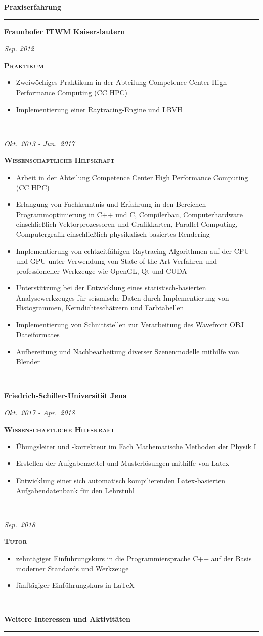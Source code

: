 \documentclass[8pt]{article}
\newcommand{\cvSection}[1]{
  \medskip
  {\Large \color{cvColor} \textbf{#1}}\\
  \parbox{\linewidth}{\rule{\linewidth}{1pt}}
  \par
}
\newcommand{\cvEducationHeading}[2]{%
  {\centering\colorbox{cvBackgroundColor}{\parbox{0.98\linewidth}{\textbf{#1} \hfill \textit{\footnotesize #2}}}} \par
}
\newenvironment{cvEducationItem}[2]{
  \medskip
  \par
  \begin{minipage}[c]{0.15\linewidth}
    \raggedleft
    \footnotesize
    \textit{#1}
  \end{minipage}
  \quad
  \vrule
  \quad
  \begin{minipage}[t]{0.7\linewidth}
    \textsc{\color{cvColor} \textbf{#2}}
    \footnotesize
    \begin{itemize}[itemsep=0mm, leftmargin=3mm]
}{
    \end{itemize}
  \end{minipage}
  \\[0.5em]
}
\begin{document}
  \cvSection{Praxiserfahrung}
  \cvEducationHeading{Fraunhofer ITWM Kaiserslautern}{}
  \begin{cvEducationItem}{Sep. 2012}{Praktikum}
    \item Zweiwöchiges Praktikum in der Abteilung Competence Center High Performance Computing (CC HPC)
    \item Implementierung einer Raytracing-Engine und LBVH
  \end{cvEducationItem}
  \begin{cvEducationItem}{Okt.~2013 - Jun.~2017}{Wissenschaftliche Hilfskraft}
    \item Arbeit in der Abteilung Competence Center High Performance Computing (CC HPC)
    \item Erlangung von Fachkenntnis und Erfahrung in den Bereichen Programmoptimierung in C++ und C, Compilerbau, Computerhardware einschließlich Vektorprozessoren und Grafikkarten, Parallel Computing, Computergrafik einschließlich physikalisch-basiertes Rendering
    \item Implementierung von echtzeitfähigen Raytracing-Algorithmen auf der CPU und GPU unter Verwendung von State-of-the-Art-Verfahren und professioneller Werkzeuge wie OpenGL, Qt und CUDA
    \item Unterstützung bei der Entwicklung eines statistisch-basierten Analysewerkzeuges für seismische Daten durch Implementierung von Histogrammen, Kerndichteschätzern und Farbtabellen
    \item Implementierung von Schnittstellen zur Verarbeitung des Wavefront OBJ Dateiformates
    \item Aufbereitung und Nachbearbeitung diverser Szenenmodelle mithilfe von Blender
  \end{cvEducationItem}

  \cvEducationHeading{Friedrich-Schiller-Universität Jena}{}
  \begin{cvEducationItem}{Okt.~2017 - Apr.~2018}{Wissenschaftliche Hilfskraft}
    \item Übungsleiter und -korrekteur im Fach Mathematische Methoden der Physik I
    \item Erstellen der Aufgabenzettel und Musterlösungen mithilfe von Latex
    \item Entwicklung einer sich automatisch kompilierenden Latex-basierten Aufgabendatenbank für den Lehrstuhl
  \end{cvEducationItem}
  \begin{cvEducationItem}{Sep.~2018}{Tutor}
    \item zehntägiger Einführungskurs in die Programmiersprache C++ auf der Basis moderner Standards und Werkzeuge
    \item fünftägiger Einführungskurs in LaTeX
  \end{cvEducationItem}

  \cvSection{Weitere Interessen und Aktivitäten}
\end{document}
